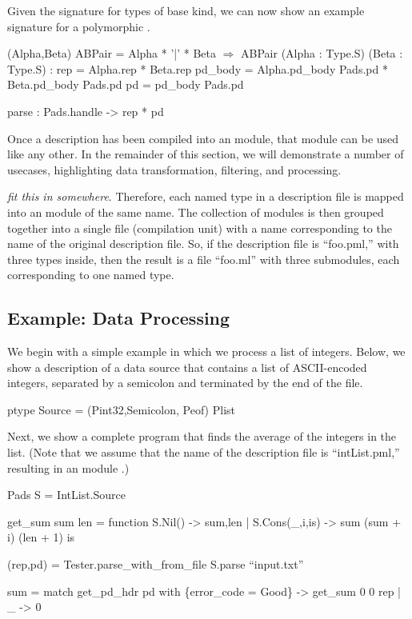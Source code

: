 Given the signature  for types of base kind, we can now
show an example signature for a polymorphic .
\begin{code}\scriptsize
{} (Alpha,Beta) ABPair = Alpha * '|' * Beta
\(\Longrightarrow\)
 ABPair (Alpha : Type.S) (Beta : Type.S) :
   rep = Alpha.rep * Beta.rep
   pd\_body = Alpha.pd\_body Pads.pd * 
                     Beta.pd\_body Pads.pd
   pd = pd\_body Pads.pd

   parse : Pads.handle -> rep * pd
\end{code}

Once a description has been compiled into an \ocaml{} module, that
module can be used like any other. In the remainder of this section,
we will demonstrate a number of usecases, highlighting data transformation,
filtering, and processing.

\emph{fit this in somewhere}.  Therefore, each named type in a
description file is mapped into an \ocaml module of the same name. The
collection of modules is then grouped together into a single file
(compilation unit) with a name corresponding to the name of the
original description file. So, if the description file is ``foo.pml,''
with three types inside, then the result is a file ``foo.ml'' with
three submodules, each corresponding to one named type.

\subsection{Example: Data Processing}
\label{sec:ex-process}

We begin with a simple example in which we process a list of
integers. Below, we show a description of a data source that contains
a list of ASCII-encoded integers, separated by a semicolon and
terminated by the end of the file.
\begin{code}\scriptsize
ptype Source = (Pint32,Semicolon, Peof) Plist\end{code}
Next, we show a complete \ocaml{} program that finds the average of
the integers in the list. (Note that we assume that the
name of the description file is ``intList.pml,'' resulting in an
\ocaml{} module .)
\begin{code}\scriptsize
{} Pads
 S = IntList.Source

 get_sum sum len = function
  S.Nil() -> sum,len
| S.Cons(_,i,is) -> sum (sum + i) (len + 1) is
  
 (rep,pd) = Tester.parse_with_from_file S.parse ``input.txt''

 sum = match get_pd_hdr pd with
            \{error_code = Good\} -> get_sum 0 0 rep
          | _ -> 0\end{code}

